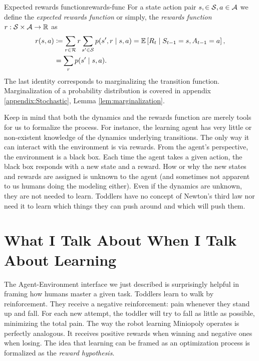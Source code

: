 \begin{dfn}{Expected rewards function}{rewards-func}
	For a state action pair $s, \in \mathcal{S}, a \in \mathcal{A}$ we define the
	\emph{expected rewards function} or simply, the \emph{rewards function} $r:
	\mathcal{S} \times \mathcal{A} \to \mathbb{R}$ as
	\begin{align*}
		r(s, a) &\coloneqq \sum_{r \in \mathcal{R}} r \sum_{s' \in \mathcal{S}} p(s', r \mid s, a) = \mathbb{E} \left[ R_t \mid S_{t-1} = s, A_{t-1} = a \right], \\
		&= \sum_r p(s' \mid s, a).
	\end{align*}
	The last identity corresponds to marginalizing the transition function.
	Marginalization of a probability distribution is covered in appendix
	\ref{appendix:Stochastic}, Lemma \ref{lem:marginalization}.
\end{dfn}

Keep in mind that both the dynamics and the rewards function are merely tools
for us to formalize the process. For instance, the learning agent has very
little or non-existent knowledge of the dynamics underlying transitions. The
only way it can interact with the environment is via rewards. From the agent's
perspective, the environment is a black box. Each time the agent takes a given
action, the black box responds with a new state and a reward. How or why the new
states and rewards are assigned is unknown to the agent (and sometimes not
apparent to us humans doing the modeling either). Even if the dynamics are
unknown, they are not needed to learn.  Toddlers have no concept of Newton's
third law nor need it to learn which things they can push around and which will
push them.

\section{What I Talk About When I Talk About Learning}

The Agent-Environment
interface we just described is surprisingly helpful in framing how humans master
a given task. Toddlers learn to walk by reinforcement.  They receive a negative
reinforcement: pain whenever they stand up and fall.  For each new attempt, the
toddler will try to fall as little as possible, minimizing the total pain. The
way the robot learning Miniopoly operates is perfectly analogous. It receives
positive rewards when winning and negative ones when losing.  The idea that
learning can be framed as an optimization process is formalized as the
\emph{reward hypothesis}.

